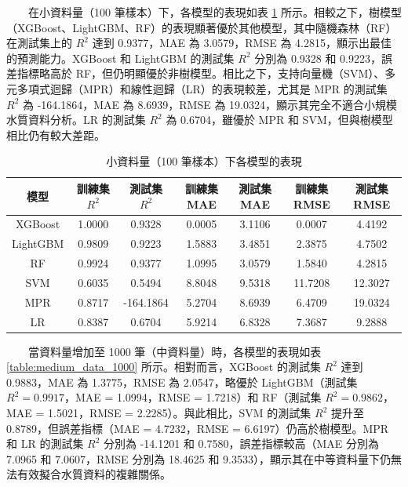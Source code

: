\documentclass[12pt,a4paper]{article}
\begin{document}
\begin{enumerate}
\begin{enumerate}[label=\arabic*.]
\begin{enumerate}[label=3-2-\arabic*.]
\begin{enumerate}[label=\Alph*.]
                　　在小資料量（100 筆樣本）下，各模型的表現如表 \ref{table:small_data} 所示。相較之下，樹模型（XGBoost、LightGBM、RF）的表現顯著優於其他模型，其中隨機森林（RF）在測試集上的 \( R^2 \) 達到 0.9377，MAE 為 3.0579，RMSE 為 4.2815，顯示出最佳的預測能力。XGBoost 和 LightGBM 的測試集 \( R^2 \) 分別為 0.9328 和 0.9223，誤差指標略高於 RF，但仍明顯優於非樹模型。相比之下，支持向量機（SVM）、多元多項式迴歸（MPR）和線性迴歸（LR）的表現較差，尤其是 MPR 的測試集 \( R^2 \) 為 -164.1864，MAE 為 8.6939，RMSE 為 19.0324，顯示其完全不適合小規模水質資料分析。LR 的測試集 \( R^2 \) 為 0.6704，雖優於 MPR 和 SVM，但與樹模型相比仍有較大差距。\\
                    \begin{table}[H]
                        \centering
                        \caption{小資料量（100 筆樣本）下各模型的表現}
                        \label{table:small_data}
                        \begin{tabular}{|c|c|c|c|c|c|c|}
                            \hline
                            模型 & 訓練集 \( R^2 \) & 測試集 \( R^2 \) & 訓練集 MAE & 測試集 MAE & 訓練集 RMSE & 測試集 RMSE \\
                            \hline
                            XGBoost & 1.0000 & 0.9328 & 0.0005 & 3.1106 & 0.0007 & 4.4192 \\
                            LightGBM & 0.9809 & 0.9223 & 1.5883 & 3.4851 & 2.3875 & 4.7502 \\
                            RF & 0.9924 & 0.9377 & 1.0995 & 3.0579 & 1.5840 & 4.2815 \\
                            SVM & 0.6035 & 0.5494 & 8.8048 & 9.5318 & 11.7208 & 12.3027 \\
                            MPR & 0.8717 & -164.1864 & 5.2704 & 8.6939 & 6.4709 & 19.0324 \\
                            LR & 0.8387 & 0.6704 & 5.9214 & 6.8328 & 7.3687 & 9.2888 \\
                            \hline
                        \end{tabular}
                    \end{table}
                　　當資料量增加至 1000 筆（中資料量）時，各模型的表現如表 \ref{table:medium_data_1000} 所示。相對而言，XGBoost 的測試集 \( R^2 \) 達到 0.9883，MAE 為 1.3775，RMSE 為 2.0547，略優於 LightGBM（測試集 \( R^2 = 0.9917 \)，MAE = 1.0994，RMSE = 1.7218）和 RF（測試集 \( R^2 = 0.9862 \)，MAE = 1.5021，RMSE = 2.2285）。與此相比，SVM 的測試集 \( R^2 \) 提升至 0.8789，但誤差指標（MAE = 4.7232，RMSE = 6.6197）仍高於樹模型。MPR 和 LR 的測試集 \( R^2 \) 分別為 -14.1201 和 0.7580，誤差指標較高（MAE 分別為 7.0965 和 7.0607，RMSE 分別為 18.4625 和 9.3533），顯示其在中等資料量下仍無法有效擬合水質資料的複雜關係。\\

\end{enumerate}
\end{enumerate}
\end{enumerate}
\end{enumerate}
\end{document}

